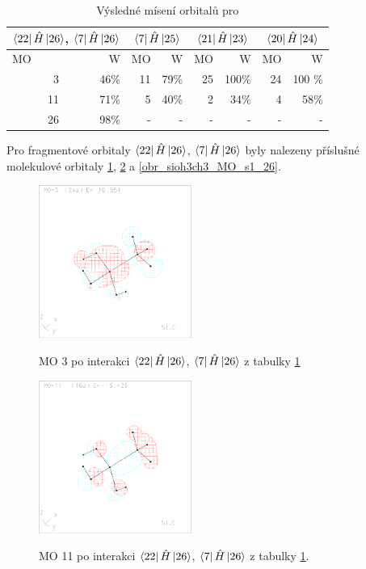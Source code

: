 \documentclass[
  digital, %
  table,   %
  lof,     %
  lot,     %
]{fithesis3}
\begin{document}
\begin{table}[htbp]
\caption{Výsledné mísení orbitalů pro }
\begin{center}
\begin{tabular}{|r|r|r|r|r|r|r|r|}
\hline
\multicolumn{2}{|c|}{$\bra{22}{\hat{H}}\ket{26}$, $\bra{7}{\hat{H}}\ket{26}$} & \multicolumn{2}{|c|}{$\bra{7}{\hat{H}}\ket{25}$}& \multicolumn{2}{|c|}{$\bra{21}{\hat{H}}\ket{23}$} &\multicolumn{2}{|c|}{$\bra{20}{\hat{H}}\ket{24}$} \\
\hline
\hline
\multicolumn{1}{|l|}{MO} & \multicolumn{1}{r|}{W} & \multicolumn{1}{l|}{MO} & \multicolumn{1}{r|}{W} & MO & \multicolumn{1}{r|}{W}& MO & \multicolumn{1}{r|}{W} \\ \hline
3 & 46\% & 11 & 79\% &25 & 100\%& 24 & 100 \% \\ \hline
11 & 71\% & 5 & 40\% & 2 & 34\% &4 & 58\% \\ \hline
26 & 98\% & - & - &  -& - &-&- \\ \hline
\end{tabular}
\end{center}
\label{tab_sioh3ch3_vysledky}
\end{table}

 Pro fragmentové orbitaly $\bra{22}{\hat{H}}\ket{26}$, $\bra{7}{\hat{H}}\ket{26}$ byly nalezeny příslušné molekulové orbitaly \ref{obr_sioh3ch3_MO_s1_3}, \ref{obr_sioh3ch3_MO_s1_11} a \ref{obr_sioh3ch3_MO_s1_26}.
  
  \begin{figure}[h]
\caption{MO 3 po interakci $\bra{22}{\hat{H}}\ket{26}$, $\bra{7}{\hat{H}}\ket{26}$ z tabulky \ref{tab_sioh3ch3_vysledky}}
  \center
  \includegraphics[width=5cm]{sioh3ch3_obrazky/s1_3.eps}
  \label{obr_sioh3ch3_MO_s1_3}
  \end{figure}

\begin{figure}[h]
\caption{MO 11 po interakci $\bra{22}{\hat{H}}\ket{26}$, $\bra{7}{\hat{H}}\ket{26}$ z tabulky \ref{tab_sioh3ch3_vysledky}.  }
  \center
  \includegraphics[width=5cm]{sioh3ch3_obrazky/s1_11.eps}
  \label{obr_sioh3ch3_MO_s1_11}
  \end{figure}
\end{document}
